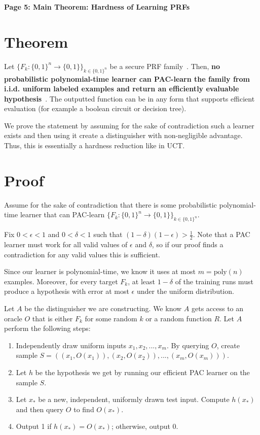 \documentclass[11pt,fleqn]{article}
\newcommand{\eps}{\epsilon}
\begin{document}
\raggedright
\setlength{\parskip}{0.6em}

{\LARGE\bfseries Page 5: Main Theorem: Hardness of Learning PRFs\par}
\medskip

\section{Theorem}

Let $\{F_k : \{0, 1\}^n \to \{0, 1\}\}_{k\in\{0,1\}^n}$ be a secure PRF family~\cite{ggm}. Then, \textbf{no probabilistic polynomial-time learner can PAC-learn the family from i.i.d. uniform labeled examples and return an efficiently evaluable hypothesis}~\cite{mit}. The outputted function can be in any form that supports efficient evaluation (for example a boolean circuit or decision tree).

We prove the statement by assuming for the sake of contradiction such a learner exists and then using it create a distinguisher with non-negligible advantage. Thus, this is essentially a hardness reduction like in UCT.

\section{Proof}

Assume for the sake of contradiction that there is some probabilistic polynomial-time learner that can PAC-learn $\{F_k : \{0, 1\}^n \to \{0, 1\}\}_{k\in\{0,1\}^n}$.

Fix $0 < \epsilon < 1$ and $0 < \delta < 1$ such that $(1- \delta)(1-\eps) > \frac{1}{2}$. Note that a PAC learner must work for all valid values of $\eps$ and $\delta$, so if our proof finds a contradiction for any valid values this is sufficient.

Since our learner is polynomial-time, we know it uses at most $m = \text{poly}(n)$ examples. Moreover, for every target $F_k$, at least $1 - \delta$ of the training runs must produce a hypothesis with error at most $\eps$ under the uniform distribution.

Let $A$ be the distinguisher we are constructing. We know $A$ gets access to an oracle $O$ that is either $F_k$ for some random $k$ or a random function $R$. Let $A$ perform the following steps:
\begin{enumerate}
    \item Independently draw uniform inputs $x_1, x_2, ..., x_m$. By querying $O$, create sample $S = ((x_1, O(x_1)), (x_2, O(x_2)), ..., (x_m, O(x_m)))$.
    \item Let $h$ be the hypothesis we get by running our efficient PAC learner on the sample $S$.
    \item Let $x_*$ be a new, independent, uniformly drawn test input. Compute $h(x_*)$ and then query $O$ to find $O(x_*)$.
    \item Output 1 if $h(x_*) = O(x_*)$; otherwise, output 0.
\end{enumerate}
\end{document}
